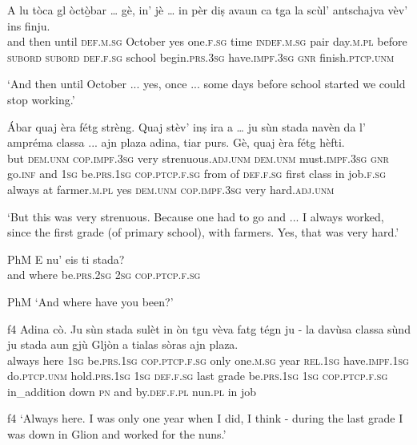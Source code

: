 \begin{linenumbers}
	\gll  A lu tòca gl òctò̱bar … gè, in' jè … in pèr diṣ avaun ca tga la scùl’ antschajva vèv’ ins finju.  \\
	and then until \textsc{def.m.sg} October {} yes one.\textsc{f.sg} time {} \textsc{indef.m.sg} pair day.\textsc{m.pl} before \textsc{subord} \textsc{subord} \textsc{def.f.sg} school begin.\textsc{prs.3sg} have.\textsc{impf.3sg} \textsc{gnr} finish.\textsc{ptcp.unm}\\
\end{linenumbers}
\medskip
\glt `And then until October ... yes, once ... some days before school started we could stop working.'
\medskip

\begin{linenumbers}
	\gll Ábar quaj èra fétg strèng. Quaj stèv’ inṣ ira a … ju sùn stada navèn da l' ampréma classa ... ajn plaza adina, tiar purs. Gè, quaj èra fétg hèfti.\\
	but \textsc{dem.unm} \textsc{cop.impf.3sg} very strenuous.\textsc{adj.unm} \textsc{dem.unm} must.\textsc{impf.3sg} \textsc{gnr} go.\textsc{inf} and {} \textsc{1sg} be.\textsc{prs.1sg} \textsc{cop.ptcp.f.sg} from of \textsc{def.f.sg} first class {} in job.\textsc{f.sg} always at farmer.\textsc{m.pl} yes \textsc{dem.unm} \textsc{cop.impf.3sg} very hard.\textsc{adj.unm}\\
\end{linenumbers}
\medskip
\glt `But this was very strenuous. Because one had to go and ... I always worked, since the first grade (of primary school), with farmers. Yes, that was very hard.'
\medskip

\begin{linenumbers}
	\gll {\ob}PhM{\cb} E nu’ eis ti stada?   \\
{}	and where be.\textsc{prs.2sg} \textsc{2sg} \textsc{cop.ptcp.f.sg}\\
\end{linenumbers}
\medskip
\glt {\ob}PhM{\cb} `And where have you been?'
\medskip

\begin{linenumbers}
	\gll {\ob}f4{\cb} Adina cò. Ju sùn stada sulèt in òn tgu vèva fatg tégn ju - la davùsa classa sùnd ju stada aun gjù Gljòn a tialas sòras ajn plaza.\\
	{}  always here \textsc{1sg} be.\textsc{prs.1sg} \textsc{cop.ptcp.f.sg} only one.\textsc{m.sg} year \textsc{rel.1sg} have.\textsc{impf.1sg} do.\textsc{ptcp.unm} hold.\textsc{prs.1sg} \textsc{1sg} {} \textsc{def.f.sg} last grade be.\textsc{prs.1sg} \textsc{1sg} \textsc{cop.ptcp.f.sg} in\_addition down \textsc{pn} and by.\textsc{def.f.pl} nun.\textsc{pl} in job\\
\end{linenumbers}
\medskip
\glt {\ob}f4{\cb} `Always here. I was only one year when I did, I think - during the last grade I was down in Glion and worked for the nuns.'
\medskip


